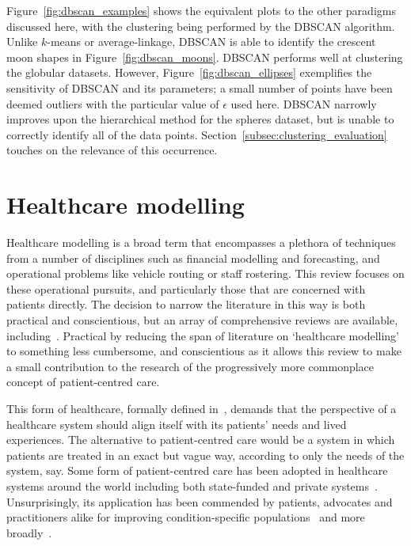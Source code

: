 Figure~\ref{fig:dbscan_examples} shows the equivalent plots to the other
paradigms discussed here, with the clustering being performed by the DBSCAN
algorithm. Unlike \(k\)-means or average-linkage, DBSCAN is able to identify the
crescent moon shapes in Figure~\ref{fig:dbscan_moons}. DBSCAN performs well at
clustering the globular datasets. However, Figure~\ref{fig:dbscan_ellipses}
exemplifies the sensitivity of DBSCAN and its parameters; a small number of
points have been deemed outliers with the particular value of \(\epsilon\) used
here. DBSCAN narrowly improves upon the hierarchical method for the spheres
dataset, but is unable to correctly identify all of the data points.
Section~\ref{subsec:clustering_evaluation} touches on the relevance of this
occurrence.

\section{Healthcare modelling}\label{sec:healthcare}

Healthcare modelling is a broad term that encompasses a plethora of techniques
from a number of disciplines such as financial modelling and forecasting, and
operational problems like vehicle routing or staff rostering. This review
focuses on these operational pursuits, and particularly those that are concerned
with patients directly. The decision to narrow the literature in this way is
both practical and conscientious, but an array of comprehensive reviews are
available, including~\cite{Brailsford2016,Galetsi2020,Kunc2018,Palmer2018}.
Practical by reducing the span of literature on `healthcare modelling' to
something less cumbersome, and conscientious as it allows this review to make a
small contribution to the research of the progressively more commonplace concept
of patient-centred care.

This form of healthcare, formally defined in~\cite{Robinson2008}, demands that
the perspective of a healthcare system should align itself with its patients'
needs and lived experiences. The alternative to patient-centred care would be a
system in which patients are treated in an exact but vague way, according to
only the needs of the system, say. Some form of patient-centred care has been
adopted in healthcare systems around the world including both state-funded and
private systems~\cite{DoH2010,Dewi2013,Luxford2011}. Unsurprisingly, its
application has been commended by patients, advocates and practitioners alike
for improving condition-specific
populations~\cite{Foster2019,Gambling2010,Gondek2016,Tsianakas2012} and more
broadly~\cite{IAPO2012,Richards2015,Santana2019}.

